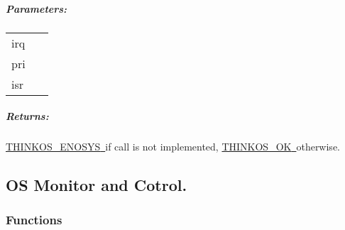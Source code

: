 {\subparagraph{\texorpdfstring{{Parameters:}}{Parameters:}}\label{parameters-49}

\protect\hypertarget{t.bfce7faafba4041e0a1d16655da9fc068af23510}{}{}\protect\hypertarget{t.50}{}{}

\begin{longtable}[]{@{}ll@{}}
\toprule
\begin{minipage}[t]{0.47\columnwidth}\raggedright\strut
{irq}{~}\strut
\end{minipage} & \begin{minipage}[t]{0.47\columnwidth}\raggedright\strut
{}\strut
\end{minipage}\tabularnewline
\begin{minipage}[t]{0.47\columnwidth}\raggedright\strut
{pri}{~}\strut
\end{minipage} & \begin{minipage}[t]{0.47\columnwidth}\raggedright\strut
{}\strut
\end{minipage}\tabularnewline
\begin{minipage}[t]{0.47\columnwidth}\raggedright\strut
{isr}{~}\strut
\end{minipage} & \begin{minipage}[t]{0.47\columnwidth}\raggedright\strut
{}\strut
\end{minipage}\tabularnewline
\bottomrule
\end{longtable}

\subparagraph{\texorpdfstring{{Returns:}}{Returns:}}\label{returns-51}

{\protect\hyperlink{h.3s49zyc}{THINKOS\_ENOSYS}}{\protect\hyperlink{h.3s49zyc}{~}}{if
call is not implemented,
}{\protect\hyperlink{h.2fk6b3p}{THINKOS\_OK}}{\protect\hyperlink{h.2fk6b3p}{~}}{otherwise.
}

\paragraph{\texorpdfstring{{}}{}}\label{section-8}

\subsection{\texorpdfstring{{OS Monitor and
Cotrol.}}{OS Monitor and Cotrol.}}\label{os-monitor-and-cotrol.}

\subsubsection{\texorpdfstring{{Functions}}{Functions}}\label{h.kgcv8k}

}
